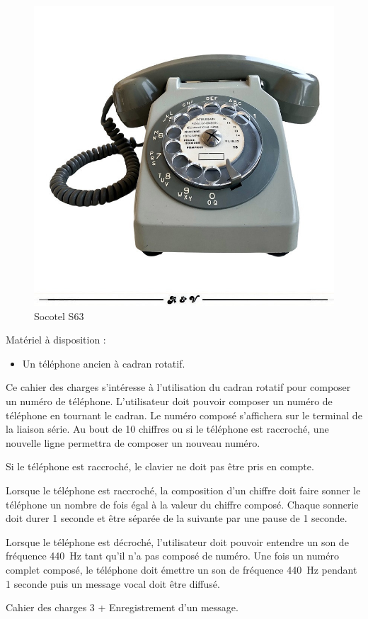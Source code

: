 \documentclass[TP, noCustomPackages]{UPSTI_Document}
\begin{document}
\begin{figure}[h!bt]
    \centering
    \includegraphics[width=.4\textwidth]{images/telephone-socotel-s63-gris-a-cadran-vintage-1970s.jpg}
    \caption{Socotel S63}
\end{figure}


Matériel à disposition : 
\begin{itemize}
    \item Un téléphone ancien à cadran rotatif. 
\end{itemize}

\begin{UPSTIactivite}
    Ce cahier des charges s'intéresse à l'utilisation du cadran rotatif pour composer un numéro de téléphone.
    L'utilisateur doit pouvoir composer un numéro de téléphone en tournant le cadran. Le numéro composé s'affichera sur le terminal de la liaison série. Au bout de 10 chiffres ou si le téléphone est raccroché, une nouvelle ligne permettra de composer un nouveau numéro.

    Si le téléphone est raccroché, le clavier ne doit pas être pris en compte.
\end{UPSTIactivite}

\begin{UPSTIactivite}
    Lorsque le téléphone est raccroché, la composition d'un chiffre doit faire sonner le téléphone un nombre de fois égal à la valeur du chiffre composé.
    Chaque sonnerie doit durer 1 seconde et être séparée de la suivante par une pause de 1 seconde.
\end{UPSTIactivite}

\begin{UPSTIactivite}
    Lorsque le téléphone est décroché, l'utilisateur doit pouvoir entendre un son de fréquence \SI{440}{Hz} tant qu'il n'a pas composé de numéro.
    Une fois un numéro complet composé, le téléphone doit émettre un son de fréquence \SI{440}{Hz} pendant 1 seconde puis un message vocal doit être diffusé.
\end{UPSTIactivite}

\begin{UPSTIactivite}
    Cahier des charges 3 + Enregistrement d'un message. 
\end{UPSTIactivite}
\end{document}
